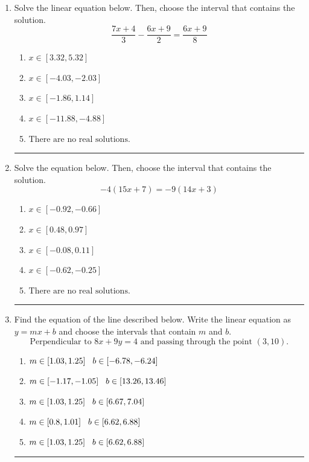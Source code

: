 \documentclass[14pt]{extbook}
\newcommand{\litem}[1]{\item#1\hspace*{-1cm}\rule{\textwidth}{0.4pt}}
\begin{document}
\begin{enumerate}
{\begin{enumerate}[label=\Alph*.]
\end{enumerate} }
\litem{
Solve the linear equation below. Then, choose the interval that contains the solution.\[ \frac{7x + 4}{3} - \frac{6x + 9}{2} = \frac{6x + 9}{8} \]\begin{enumerate}[label=\Alph*.]
\item \( x \in [3.32, 5.32] \)
\item \( x \in [-4.03, -2.03] \)
\item \( x \in [-1.86, 1.14] \)
\item \( x \in [-11.88, -4.88] \)
\item \( \text{There are no real solutions.} \)

\end{enumerate} }
\litem{
Solve the equation below. Then, choose the interval that contains the solution.\[ -4(15x + 7) = -9(14x + 3) \]\begin{enumerate}[label=\Alph*.]
\item \( x \in [-0.92, -0.66] \)
\item \( x \in [0.48, 0.97] \)
\item \( x \in [-0.08, 0.11] \)
\item \( x \in [-0.62, -0.25] \)
\item \( \text{There are no real solutions.} \)

\end{enumerate} }
\litem{
Find the equation of the line described below. Write the linear equation as $ y=mx+b $ and choose the intervals that contain $m$ and $b$.\[ \text{Perpendicular to } 8 x + 9 y = 4 \text{ and passing through the point } (3, 10). \]\begin{enumerate}[label=\Alph*.]
\item \( m \in [1.03, 1.25] \hspace*{3mm} b \in [-6.78, -6.24] \)
\item \( m \in [-1.17, -1.05] \hspace*{3mm} b \in [13.26, 13.46] \)
\item \( m \in [1.03, 1.25] \hspace*{3mm} b \in [6.67, 7.04] \)
\item \( m \in [0.8, 1.01] \hspace*{3mm} b \in [6.62, 6.88] \)
\item \( m \in [1.03, 1.25] \hspace*{3mm} b \in [6.62, 6.88] \)


\end{enumerate}}
\end{enumerate}
\end{document}
